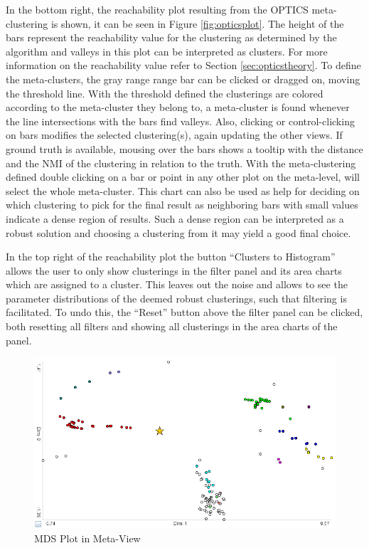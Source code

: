 \documentclass[
	a4paper,
	english,
	twoside,
	openright,               
	11pt                            
	]{report}
\begin{document}
In the bottom right, the reachability plot resulting from the OPTICS meta-clustering is shown, it can be seen in Figure \ref{fig:opticsplot}. The height of the bars represent the reachability value for the clustering as determined by the algorithm and valleys in this plot can be interpreted as clusters. For more information on the reachability value refer to Section \ref{sec:opticstheory}. To define the meta-clusters, the gray range range bar can be clicked or dragged on, moving the threshold line. With the threshold defined the clusterings are colored according to the meta-cluster they belong to, a meta-cluster is found whenever the line intersections with the bars find valleys. Also, clicking or control-clicking on bars modifies the selected clustering(s), again updating the other views. If ground truth is available, mousing over the bars shows a tooltip with the distance and the NMI of the clustering in relation to the truth. With the meta-clustering defined double clicking on a bar or point in any other plot on the meta-level, will select the whole meta-cluster. This chart can also be used as help for deciding on which clustering to pick for the final result as neighboring bars with small values indicate a dense region of results. Such a dense region can be interpreted as a robust solution and choosing a clustering from it may yield a good final choice. 

In the top right of the reachability plot the button ``Clusters to Histogram'' allows the user to only show clusterings in the filter panel and its area charts which are assigned to a cluster. This leaves out the noise and allows to see the parameter distributions of the deemed robust clusterings, such that filtering is facilitated. To undo this, the ``Reset'' button above the filter panel can be clicked, both resetting all filters and showing all clusterings in the area charts of the panel.

\begin{figure}[h]
	\centering
	\includegraphics[scale=.45]{mds-plot}
	\caption{MDS Plot in Meta-View}
	\label{fig:mdsplot}
\end{figure}
\end{document}
